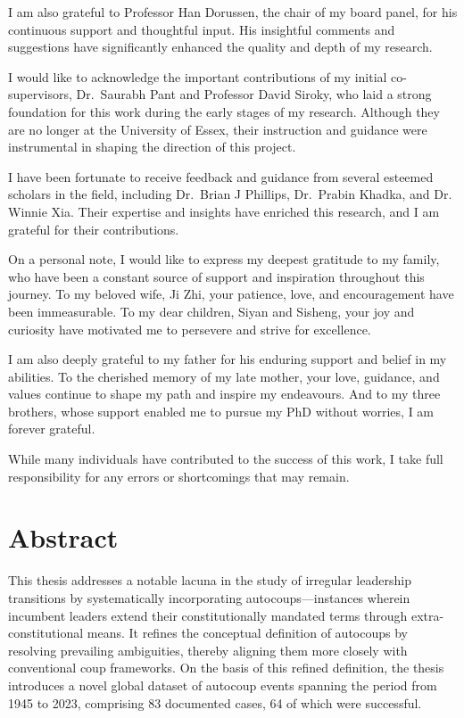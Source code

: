 \documentclass[
  12pt,
]{report}
\begin{document}
I am also grateful to Professor Han Dorussen, the chair of my board
panel, for his continuous support and thoughtful input. His insightful
comments and suggestions have significantly enhanced the quality and
depth of my research.

I would like to acknowledge the important contributions of my initial
co-supervisors, Dr.~Saurabh Pant and Professor David Siroky, who laid a
strong foundation for this work during the early stages of my research.
Although they are no longer at the University of Essex, their
instruction and guidance were instrumental in shaping the direction of
this project.

I have been fortunate to receive feedback and guidance from several
esteemed scholars in the field, including Dr.~Brian J Phillips,
Dr.~Prabin Khadka, and Dr. Winnie Xia. Their expertise and insights have
enriched this research, and I am grateful for their contributions.

On a personal note, I would like to express my deepest gratitude to my
family, who have been a constant source of support and inspiration
throughout this journey. To my beloved wife, Ji Zhi, your patience,
love, and encouragement have been immeasurable. To my dear children,
Siyan and Sisheng, your joy and curiosity have motivated me to persevere
and strive for excellence.

I am also deeply grateful to my father for his enduring support and
belief in my abilities. To the cherished memory of my late mother, your
love, guidance, and values continue to shape my path and inspire my
endeavours. And to my three brothers, whose support enabled me to pursue
my PhD without worries, I am forever grateful.

While many individuals have contributed to the success of this work, I
take full responsibility for any errors or shortcomings that may remain.

\chapter*{Abstract}\label{abstract}

This thesis addresses a notable lacuna in the study of irregular
leadership transitions by systematically incorporating
autocoups---instances wherein incumbent leaders extend their
constitutionally mandated terms through extra-constitutional means. It
refines the conceptual definition of autocoups by resolving prevailing
ambiguities, thereby aligning them more closely with conventional coup
frameworks. On the basis of this refined definition, the thesis
introduces a novel global dataset of autocoup events spanning the period
from 1945 to 2023, comprising 83 documented cases, 64 of which were
successful.
\end{document}
